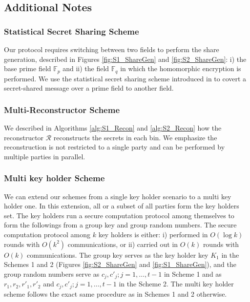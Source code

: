 \subsection{Additional Notes}
\subsubsection{Statistical Secret Sharing Scheme}
Our protocol requires switching between two fields to perform the share generation, described in Figures \ref{fig:S1_ShareGen} and \ref{fig:S2_ShareGen}: i) the base prime field $\mathbb{F}_p$ and ii) the field $\mathbb{F}_q$ in which the homomorphic encryption is performed. We use the statistical secret sharing scheme introduced in  \cite{Statistical_SSS} to covert a secret-shared message over a prime field to another field. 
\subsubsection{Multi-Reconstructor Scheme}
We described in Algorithms \ref{alg:S1_Recon} and \ref{alg:S2_Recon} how the reconstructor $\mathcal{R}$ reconstructs the secrets in each bin. We emphasize the reconstruction is not restricted to a single party and can be performed by multiple parties in parallel. 
\subsubsection{Multi key holder Scheme} \label{Multi-Key-Holder}
We can extend our schemes from a single key holder scenario to a multi key holder one. In this extension, all or a subset of all parties form the key holders set. The key holders run a secure computation protocol among themselves to form the followings from a group key and group random numbers. The secure computation protocol among $k$ key holders is either: i) performed in $O(\log{k})$ rounds with $O(k^2)$ communications, or ii) carried out in $O(k)$ rounds with $O(k)$ communications. The group key serves as the key holder key $K_1$ in the Schemes 1 and 2 (Figures \ref{fig:S2_ShareGen} and \ref{fig:S1_ShareGen}), and the group random numbers serve as $c_j, c'_j; j=1,\dots,t-1$ in Scheme 1 and as $r_1, r_2, r'_1, r'_2$ and $c_j, c'_j; j=1,\dots,t-1$ in the Scheme 2. The multi key holder scheme follows the exact same procedure as in Schemes 1 and 2 otherwise. 
